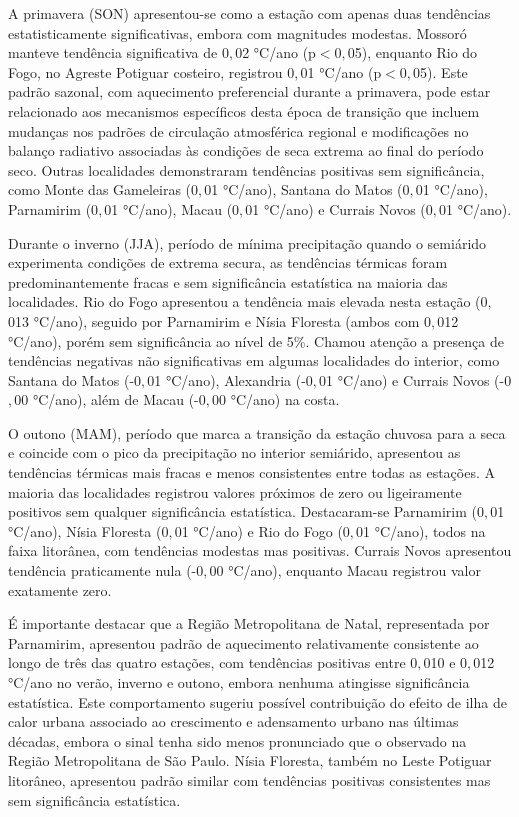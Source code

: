 A primavera (SON) apresentou-se como a estação com apenas duas tendências estatisticamente significativas, embora com magnitudes modestas. Mossoró manteve tendência significativa de 0${,}$02 °C/ano (p$<$0${,}$05), enquanto Rio do Fogo, no Agreste Potiguar costeiro, registrou 0${,}$01 °C/ano (p$<$0${,}$05). Este padrão sazonal, com aquecimento preferencial durante a primavera, pode estar relacionado aos mecanismos específicos desta época de transição que incluem mudanças nos padrões de circulação atmosférica regional e modificações no balanço radiativo associadas às condições de seca extrema ao final do período seco. Outras localidades demonstraram tendências positivas sem significância, como Monte das Gameleiras (0${,}$01 °C/ano), Santana do Matos (0${,}$01 °C/ano), Parnamirim (0${,}$01 °C/ano), Macau (0${,}$01 °C/ano) e Currais Novos (0${,}$01 °C/ano).

Durante o inverno (JJA), período de mínima precipitação quando o semiárido experimenta condições de extrema secura, as tendências térmicas foram predominantemente fracas e sem significância estatística na maioria das localidades. Rio do Fogo apresentou a tendência mais elevada nesta estação (0${,}$013 °C/ano), seguido por Parnamirim e Nísia Floresta (ambos com 0${,}$012 °C/ano), porém sem significância ao nível de 5\%. Chamou atenção a presença de tendências negativas não significativas em algumas localidades do interior, como Santana do Matos (-0${,}$01 °C/ano), Alexandria (-0${,}$01 °C/ano) e Currais Novos (-0${,}$00 °C/ano), além de Macau (-0${,}$00 °C/ano) na costa.

O outono (MAM), período que marca a transição da estação chuvosa para a seca e coincide com o pico da precipitação no interior semiárido, apresentou as tendências térmicas mais fracas e menos consistentes entre todas as estações. A maioria das localidades registrou valores próximos de zero ou ligeiramente positivos sem qualquer significância estatística. Destacaram-se Parnamirim (0${,}$01 °C/ano), Nísia Floresta (0${,}$01 °C/ano) e Rio do Fogo (0${,}$01 °C/ano), todos na faixa litorânea, com tendências modestas mas positivas. Currais Novos apresentou tendência praticamente nula (-0${,}$00 °C/ano), enquanto Macau registrou valor exatamente zero.

É importante destacar que a Região Metropolitana de Natal, representada por Parnamirim, apresentou padrão de aquecimento relativamente consistente ao longo de três das quatro estações, com tendências positivas entre 0${,}$010 e 0${,}$012 °C/ano no verão, inverno e outono, embora nenhuma atingisse significância estatística. Este comportamento sugeriu possível contribuição do efeito de ilha de calor urbana associado ao crescimento e adensamento urbano nas últimas décadas, embora o sinal tenha sido menos pronunciado que o observado na Região Metropolitana de São Paulo. Nísia Floresta, também no Leste Potiguar litorâneo, apresentou padrão similar com tendências positivas consistentes mas sem significância estatística.

